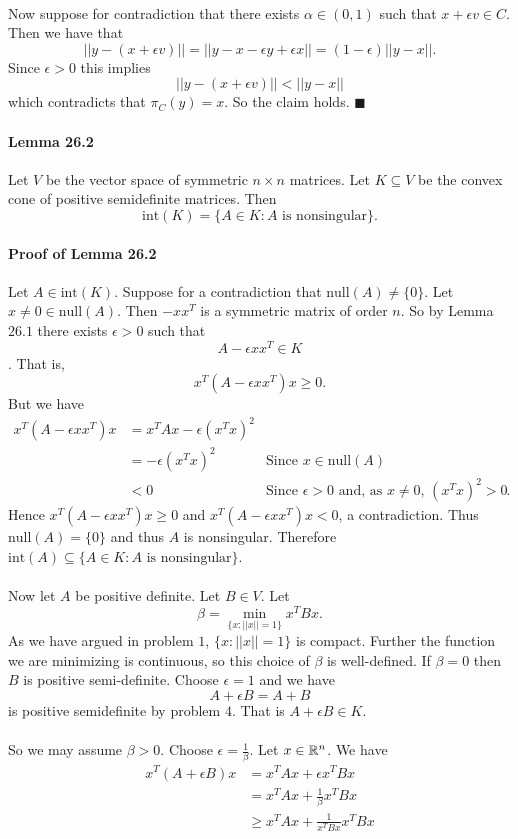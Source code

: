 \documentclass[letterpaper,12pt,oneside,onecolumn]{article}
\begin{document}
\paragraph{}
Now suppose for contradiction that there exists $\alpha \in (0,1)$ such that $x + \epsilon v \in C$. Then we have that
$$ ||y - (x + \epsilon v)|| = ||y - x - \epsilon y + \epsilon x|| = (1-\epsilon) ||y-x||.$$
Since $\epsilon > 0$ this implies
$$||y - (x + \epsilon v)|| < ||y -x|| $$
which contradicts that $\pi_C(y) = x$. So the claim holds. $\blacksquare$
\paragraph{Lemma 26.2}
Let $V$ be the vector space of symmetric $n\times n$ matrices. Let $K\subseteq V$ be the convex cone of positive semidefinite matrices. Then $$\text{int}(K) =\{A \in K : A\text{ is nonsingular}\}.$$
\paragraph{Proof of Lemma 26.2}
Let $A \in \text{int}(K)$. Suppose for a contradiction that $\text{null}(A) \neq \{0\}$. Let $x \neq 0 \in \text{null}(A)$. Then $-xx^T$ is a symmetric matrix of order $n$. So by Lemma $26.1$ there exists $\epsilon > 0$ such that $$A - \epsilon xx^T \in K$$. That is,
$$x^T(A - \epsilon xx^T)x \geq 0.$$
But we have
\begin{align*}
x^T(A - \epsilon xx^T)x &= x^TAx - \epsilon (x^Tx)^2  \\
&= -\epsilon (x^Tx)^2  &\text{Since $x\in\text{null}(A)$} \\
&< 0 &\text{Since $\epsilon > 0$ and, as $x \neq 0$, $(x^Tx)^2 > 0$}. 
\end{align*}
Hence $x^T(A - \epsilon xx^T)x \geq 0$ and $x^T(A - \epsilon xx^T)x  < 0$, a contradiction. Thus $\text{null}(A) = \{0\}$ and thus $A$ is nonsingular. Therefore $\text{int}(A) \subseteq \{A \in K : A \text{ is nonsingular}\}$.
\paragraph{}
Now let $A$ be positive definite. Let $B \in V$. Let
$$ \beta = \min_{\{x : ||x|| = 1\}} x^T B x.$$
As we have argued in problem $1$, $\{x : ||x||=1\}$ is compact. Further the function we are minimizing is continuous, so this choice of $\beta$ is well-defined. If $\beta = 0$ then $B$ is positive semi-definite. Choose $\epsilon = 1$ and we have
$$A + \epsilon B = A + B$$
is positive semidefinite by problem $4$. That is $A +\epsilon B \in K$.
\paragraph{}
So we may assume $\beta > 0$. Choose $\epsilon = \frac{1}{\beta}$. Let $x \in \mathbb{R}^n$. We have
\begin{align*}
x^T(A + \epsilon B) x &= x^TAx + \epsilon x^T B x \\
&= x^TAx + \frac{1}{\beta} x^T B x \\
&\geq x^TAx + \frac{1}{x^TBx} x^TBx 
\end{align*}
\end{document}
